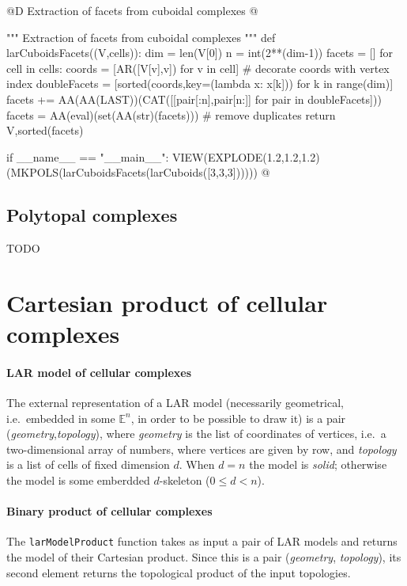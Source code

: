 \documentclass[11pt,oneside]{article}	%
\def\E{\mathbb{E}}
\begin{document}
@D Extraction of facets from cuboidal complexes
@{""" Extraction of facets from cuboidal complexes """
def larCuboidsFacets((V,cells)):
	dim = len(V[0])
	n = int(2**(dim-1))
	facets = []
	for cell in cells:
		coords = [AR([V[v],v]) for v in cell] # decorate coords with vertex index
		doubleFacets = [sorted(coords,key=(lambda x: x[k])) for k in range(dim)]
		facets += AA(AA(LAST))(CAT([[pair[:n],pair[n:]] for pair in doubleFacets]))
	facets = AA(eval)(set(AA(str)(facets))) # remove duplicates
	return V,sorted(facets)

if __name__ == "__main__":
	VIEW(EXPLODE(1.2,1.2,1.2)(MKPOLS(larCuboidsFacets(larCuboids([3,3,3])))))
@}


\subsection{Polytopal complexes}

TODO

\section{Cartesian product of cellular complexes}
\label{sec:product}

\paragraph{LAR model of cellular complexes}

The external representation of a LAR model (necessarily geometrical, i.e.~embedded in some $\E^n$, in order to be possible to draw it) is a pair (\emph{geometry},\emph{topology}), where \emph{geometry} is the list of coordinates of vertices, i.e.~a two-dimensional array of numbers, where vertices are given by row, and \emph{topology} is a list of cells of fixed dimension $d$. When $d=n$ the model is \emph{solid}; otherwise  the model is some emberdded $d$-skeleton ($0\leq d <n$).

\paragraph{Binary product of cellular complexes}
The \texttt{larModelProduct} function takes as input a pair of LAR models and returns the model of their Cartesian product. Since this is a pair (\emph{geometry}, \emph{topology}), its second element returns the topological product of the input topologies.
\end{document}
